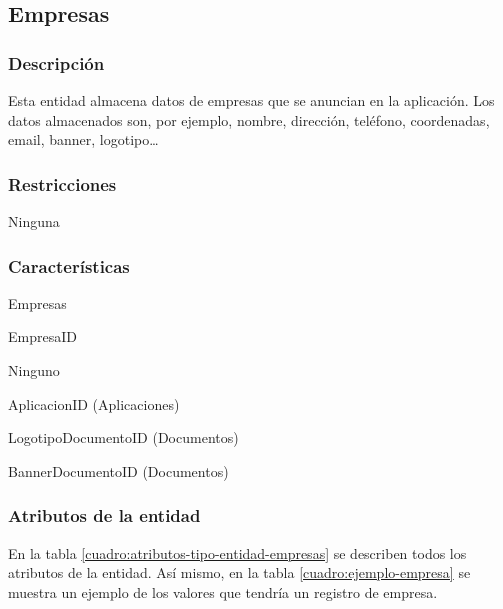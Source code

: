 \subsection{Empresas}

\subsubsection*{Descripción}
Esta entidad almacena datos de empresas que se anuncian en la aplicación. Los datos almacenados son, por ejemplo, nombre, dirección, teléfono, coordenadas, email, banner, logotipo\dots

\subsubsection*{Restricciones}
Ninguna

\subsubsection*{Características}
\begin{description}[nosep,style=multiline,labelindent=0.8cm,leftmargin=4.5cm,font=\normalfont]
    \item[Nombre] Empresas
    \item[Id. principal] EmpresaID
    \item[Id. alternativo] Ninguno
    \item[Atrib. heredados]
        AplicacionID (Aplicaciones)
    
        LogotipoDocumentoID (Documentos)
        
        BannerDocumentoID (Documentos)
\end{description}

\subsubsection*{Atributos de la entidad}
En la tabla \ref{cuadro:atributos-tipo-entidad-empresas} se describen todos los atributos de la entidad. Así mismo, en la tabla \ref{cuadro:ejemplo-empresa} se muestra un ejemplo de los valores que tendría un registro de empresa.

